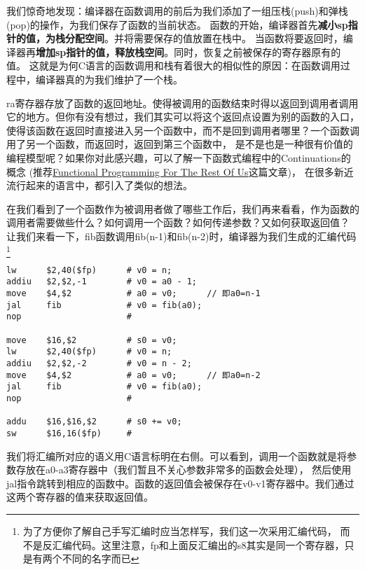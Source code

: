我们惊奇地发现：编译器在函数调用的前后为我们添加了一组压栈(push)和弹栈(pop)的操作，为我们保存了函数的当前状态。
函数的开始，编译器首先\textbf{减小sp指针的值，为栈分配空间}。并将需要保存的值放置在栈中。
当函数将要返回时，编译器再\textbf{增加sp指针的值，释放栈空间}。同时，恢复之前被保存的寄存器原有的值。
这就是为何C语言的函数调用和栈有着很大的相似性的原因：在函数调用过程中，编译器真的为我们维护了一个栈。

\begin{note}
ra寄存器存放了函数的返回地址。使得被调用的函数结束时得以返回到调用者调用它的地方。但你有没有想过，我们其实可以将这个返回点设置为别的函数的入口，
使得该函数在返回时直接进入另一个函数中，而不是回到调用者哪里？一个函数调用了另一个函数，而返回时，返回到第三个函数中，
是不是也是一种很有价值的编程模型呢？如果你对此感兴趣，可以了解一下函数式编程中的Continuations的概念
(推荐\href{https://github.com/justinyhuang/Functional-Programming-For-The-Rest-of-Us-Cn/blob/master/FunctionalProgrammingForTheRestOfUs.cn.md}
{Functional Programming For The Rest Of Us}这篇文章)，
在很多新近流行起来的语言中，都引入了类似的想法。
\end{note}

在我们看到了一个函数作为被调用者做了哪些工作后，我们再来看看，作为函数的调用者需要做些什么？如何调用一个函数？如何传递参数？又如何获取返回值？
让我们来看一下，fib函数调用fib(n-1)和fib(n-2)时，编译器为我们生成的汇编代码\footnote{为了方便你了解自己手写汇编时应当怎样写，我们这一次采用汇编代码，
而不是反汇编代码。这里注意，fp和上面反汇编出的s8其实是同一个寄存器，只是有两个不同的名字而已}

\begin{verbatim}
lw      $2,40($fp)      # v0 = n;
addiu   $2,$2,-1        # v0 = a0 - 1;
move    $4,$2           # a0 = v0;      // 即a0=n-1
jal     fib             # v0 = fib(a0);
nop                     #

move    $16,$2          # s0 = v0;
lw      $2,40($fp)      # v0 = n;
addiu   $2,$2,-2        # v0 = n - 2;
move    $4,$2           # a0 = v0;      // 即a0=n-2
jal     fib             # v0 = fib(a0);
nop                     #

addu    $16,$16,$2      # s0 += v0;
sw      $16,16($fp)     #
\end{verbatim}

我们将汇编所对应的语义用C语言标明在右侧。可以看到，调用一个函数就是将参数存放在a0-a3寄存器中（我们暂且不关心参数非常多的函数会处理），
然后使用jal指令跳转到相应的函数中。函数的返回值会被保存在v0-v1寄存器中。我们通过这两个寄存器的值来获取返回值。

